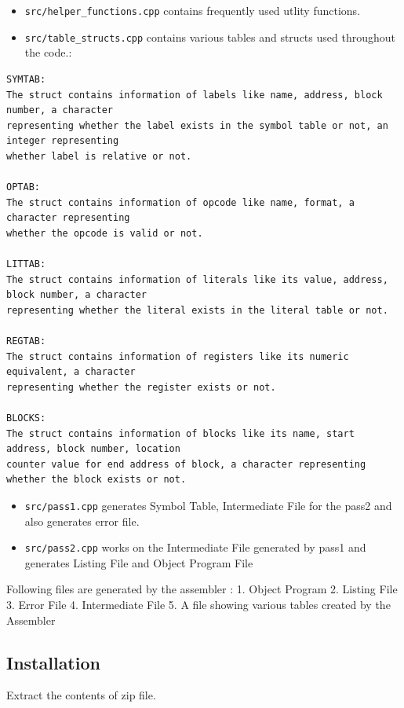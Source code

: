 \documentclass[
]{article}
\providecommand{\tightlist}{%
  \setlength{\itemsep}{0pt}\setlength{\parskip}{0pt}}
\begin{document}
\begin{itemize}
\tightlist
\item
  \texttt{src/helper\_functions.cpp} contains frequently used utlity
  functions.
\item
  \texttt{src/table\_structs.cpp} contains various tables and structs
  used throughout the code.:
\end{itemize}

\begin{verbatim}
SYMTAB:
The struct contains information of labels like name, address, block number, a character 
representing whether the label exists in the symbol table or not, an integer representing 
whether label is relative or not.

OPTAB:
The struct contains information of opcode like name, format, a character representing 
whether the opcode is valid or not.

LITTAB:
The struct contains information of literals like its value, address, block number, a character 
representing whether the literal exists in the literal table or not.

REGTAB:
The struct contains information of registers like its numeric equivalent, a character 
representing whether the register exists or not.

BLOCKS:
The struct contains information of blocks like its name, start address, block number, location 
counter value for end address of block, a character representing whether the block exists or not.
\end{verbatim}

\begin{itemize}
\item
  \texttt{src/pass1.cpp} generates Symbol Table, Intermediate File for
  the pass2 and also generates error file.
\item
  \texttt{src/pass2.cpp} works on the Intermediate File generated by
  pass1 and generates Listing File and Object Program File
\end{itemize}

Following files are generated by the assembler : 1. Object Program 2.
Listing File 3. Error File 4. Intermediate File 5. A file showing
various tables created by the Assembler

\subsection{Installation}\label{installation}

Extract the contents of zip file.
\end{document}
